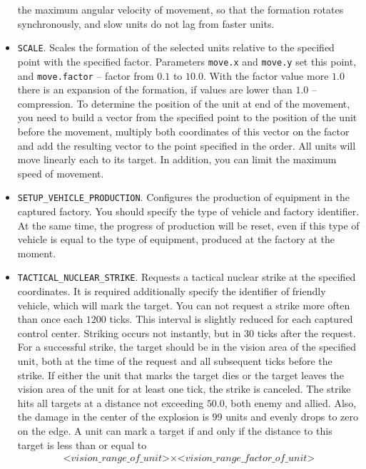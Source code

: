 \begin{itemize}
        the maximum angular velocity of movement, so that the formation rotates synchronously, and slow units do not lag from
        faster units.
    \item \texttt{SCALE}. Scales the formation of the selected units relative to the specified point with the specified factor. Parameters
        \texttt{move.x} and \texttt{move.y} set this point, and \texttt{move.factor} – factor from $0.1$ to $10.0$. With the factor value
        more $1.0$ there is an expansion of the formation, if values are lower than $1.0$ -- compression. To determine the position of the unit at
        end of the movement, you need to build a vector from the specified point to the position of the unit before the movement, multiply both coordinates of this
        vector on the factor and add the resulting vector to the point specified in the order. All units will move linearly each to
        its target. In addition, you can limit the maximum speed of movement.
    \item \texttt{SETUP\_VEHICLE\_PRODUCTION}. Configures the production of equipment in the captured factory. You should specify the type of
        vehicle and factory identifier. At the same time, the progress of production will be reset, even if this type of vehicle is equal to the type of equipment,
        produced at the factory at the moment.
    \item \texttt{TACTICAL\_NUCLEAR\_STRIKE}. Requests a tactical nuclear strike at the specified coordinates. It is required
        additionally specify the identifier of friendly vehicle, which will mark the target. You can not request a strike
        more often than once each $1200$ ticks. This interval is slightly reduced for each captured control center. Striking occurs
        not instantly, but in $30$ ticks after the request. For a successful strike, the target should be in the vision area
        of the specified unit, both at the time of the request and all subsequent ticks before the strike. If either the unit that marks the target dies
        or the target leaves the vision area of the unit for at least one tick, the strike is canceled. The strike hits all targets at a distance
        not exceeding $50.0$, both enemy and allied. Also, the damage in the center of the explosion is $99$ units and evenly drops to
        zero on the edge. A unit can mark a target if and only if the distance to this target is less than or equal to
        \begin{equation}
        \begin{split}
        \textit{<vision\_range\_of\_unit>}\times\textit{<vision\_range\_factor\_of\_unit>}
        \end{split}
        \end{equation}
\end{itemize}

